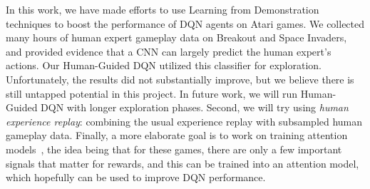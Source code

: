 \documentclass[letterpaper, 10pt, conference]{ieeeconf}
\begin{document}
In this work, we have made efforts to use Learning from Demonstration techniques
to boost the performance of DQN agents on Atari games. We collected many hours
of human expert gameplay data on Breakout and Space Invaders, and provided
evidence that a CNN can largely predict the human expert's actions. Our
Human-Guided DQN utilized this classifier for exploration. Unfortunately, the
results did not substantially improve, but we believe there is still untapped
potential in this project. In future work, we will run Human-Guided DQN with
longer exploration phases. Second, we will try using \emph{human experience
replay}: combining the usual experience replay with subsampled human gameplay
data. Finally, a more elaborate goal is to work on training attention
models~\cite{NIPS2014_5542,icml2015_xuc15}, the idea being that for these games,
there are only a few important signals that matter for rewards, and this can be
trained into an attention model, which hopefully can be used to improve DQN
performance.



\end{document}

